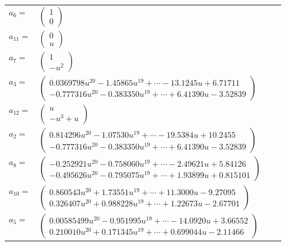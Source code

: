 \documentclass[1p]{elsarticle_modified}
\theoremstyle{definition}
\begin{document}
\begin{tabular}{m{7pt} m{180pt} m{7pt} m{180pt} }
\flushright $a_{6}=$&$\begin{pmatrix}1\\0\end{pmatrix}$ \\
\flushright $a_{11}=$&$\begin{pmatrix}0\\u\end{pmatrix}$ \\
\flushright $a_{7}=$&$\begin{pmatrix}1\\- u^2\end{pmatrix}$ \\
\flushright $a_{3}=$&$\begin{pmatrix}0.0369798 u^{20}-1.45865 u^{19}+\cdots-13.1245 u+6.71711\\-0.777316 u^{20}-0.383350 u^{19}+\cdots+6.41390 u-3.52839\end{pmatrix}$ \\
\flushright $a_{12}=$&$\begin{pmatrix}u\\- u^3+u\end{pmatrix}$ \\
\flushright $a_{2}=$&$\begin{pmatrix}0.814296 u^{20}-1.07530 u^{19}+\cdots-19.5384 u+10.2455\\-0.777316 u^{20}-0.383350 u^{19}+\cdots+6.41390 u-3.52839\end{pmatrix}$ \\
\flushright $a_{8}=$&$\begin{pmatrix}-0.252921 u^{20}-0.758060 u^{19}+\cdots-2.49621 u+5.84126\\-0.495626 u^{20}-0.795075 u^{19}+\cdots+1.93899 u+0.815101\end{pmatrix}$ \\
\flushright $a_{10}=$&$\begin{pmatrix}0.860543 u^{20}+1.73551 u^{19}+\cdots+11.3000 u-9.27095\\0.326407 u^{20}+0.988228 u^{19}+\cdots+1.22673 u-2.67701\end{pmatrix}$ \\
\flushright $a_{5}=$&$\begin{pmatrix}0.00585499 u^{20}-0.951995 u^{19}+\cdots-14.0920 u+3.66552\\0.210010 u^{20}+0.171345 u^{19}+\cdots+0.699044 u-2.11466\end{pmatrix}$ \\

\end{tabular}
\end{document}
